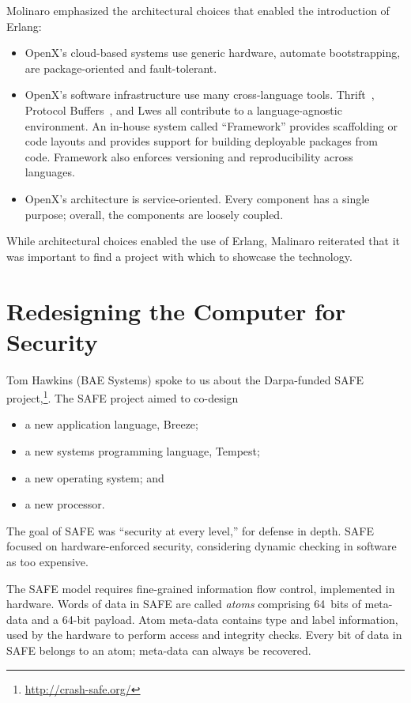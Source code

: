 \documentclass{jfp1}
\begin{document}
Molinaro emphasized the architectural choices that enabled the
introduction of Erlang:

\begin{itemize}

\item OpenX's cloud-based systems use generic hardware, automate
bootstrapping, are package-oriented and fault-tolerant.

\item OpenX's software infrastructure use many cross-language
tools. Thrift~\cite{Slee:Thrift}, Protocol
Buffers~\cite{Google:2014:Protobufs}, and Lwes all contribute to a
language-agnostic environment. An in-house system called ``Framework''
provides scaffolding or code layouts and provides support for building
deployable packages from code. Framework also enforces versioning and
reproducibility across languages.

\item OpenX's architecture is service-oriented. Every component has a
single purpose; overall, the components are loosely coupled.

\end{itemize}
While architectural choices enabled the use of Erlang, Malinaro reiterated
that it was important to find a project with which to showcase the
technology.

\section{Redesigning the Computer for Security}


Tom Hawkins (BAE Systems) spoke to us about the Darpa-funded SAFE
project,\footnote{\url{http://crash-safe.org/}}. The SAFE project aimed to
co-design 
\begin{itemize}
\item a new application language, Breeze;
\item a new systems programming language, Tempest;
\item a new operating system; and
\item a new processor.
\end{itemize}
The goal of SAFE was ``security at every level,'' for defense in depth.
SAFE focused on hardware-enforced security, considering dynamic checking
in software as too expensive. 

The SAFE model requires fine-grained information flow control, implemented
in hardware. Words of data in SAFE are called \textit{atoms} comprising
64~bits of meta-data and a 64-bit payload. Atom meta-data contains type
and label information, used by the hardware to perform access and
integrity checks. Every bit of data in SAFE belongs to an atom; meta-data
can always be recovered.
\end{document}
